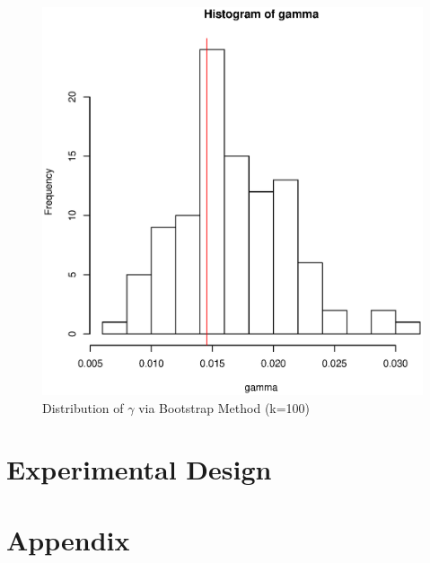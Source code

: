 \documentclass[11pt, fleqn]{article}
\begin{document}
\begin{figure}[!htb]
  \centering
  \includegraphics[scale=.5]{bootstrap_hist.eps}
  \caption{Distribution of $\gamma$ via Bootstrap Method (k=100)}
  \label{fig:bootstrap_hist}
\end{figure}

\section{Experimental Design}

\section{Appendix}
\end{document}
